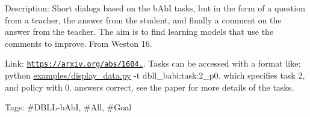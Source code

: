 Description\+: Short dialogs based on the b\+AbI tasks, but in the form of a question from a teacher, the answer from the student, and finally a comment on the answer from the teacher. The aim is to find learning models that use the comments to improve. From Weston \textquotesingle{}16.

Link\+: \href{https://arxiv.org/abs/1604.06045}{\tt https\+://arxiv.\+org/abs/1604.}. Tasks can be accessed with a format like\+: \textquotesingle{}python \hyperlink{examples_2display__data_8py}{examples/display\+\_\+data.\+py} -\/t dbll\+\_\+babi\+:task\+:2\+\_\+p0.\textquotesingle{} which specifies task 2, and policy with 0. answers correct, see the paper for more details of the tasks.

Tags\+: \#\+D\+B\+LL-\/b\+AbI, \#\+All, \#\+Goal 